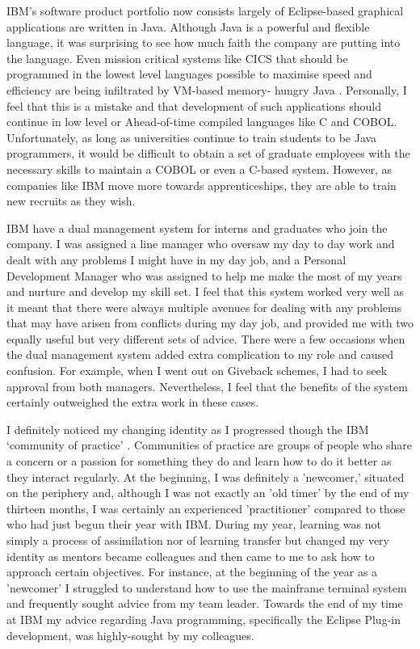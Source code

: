 \documentclass[12pt,a4paper]{article}
\begin{document}
IBM's software product portfolio now consists largely of Eclipse-based 
graphical applications are written in Java. Although Java is a powerful
and flexible language, it was surprising to see how much faith the company
are putting into the language. Even mission critical systems like CICS 
that should be programmed in the lowest level languages possible to 
maximise speed and efficiency are being infiltrated by VM-based memory-
hungry Java \cite{cicsJava}. Personally, I feel that this is a
mistake and that development of such applications should continue in 
low level or Ahead-of-time compiled languages like C and COBOL. Unfortunately,
as long as universities continue to train students to be Java programmers, it
would be difficult to obtain a set of graduate employees with the necessary 
skills to maintain a COBOL or even a C-based system. However, as companies like
IBM move more towards apprenticeships, they are able to train new recruits as
they wish.

IBM have a dual management system for interns and graduates who join the 
company. I was assigned a line manager who oversaw my day to day work and
dealt with any problems I might have in my day job, and a Personal 
Development Manager who was assigned to help me make the most of my years
and nurture and develop my skill set. I feel that this system worked very 
well as it meant that there were always multiple avenues for dealing with
any problems that may have arisen from conflicts during my day job, and 
provided me with two equally useful but very different sets of advice. 
There were a few occasions when the dual management system added extra
complication to my role and caused confusion. For example, when I went
out on Giveback schemes, I had to seek approval from both managers. 
Nevertheless, I feel that the benefits of the system certainly outweighed 
the extra work in these cases.

I definitely noticed my changing identity as I progressed though the IBM
‘community of practice’ \cite{Communities}. Communities of practice are
groups of people who share a concern or a passion for something they do and
learn how to do it better as they interact regularly. At the beginning, I was
definitely a 'newcomer,' situated on the periphery and, although I was not
exactly an 'old timer' by the end of my thirteen months, I was certainly an
experienced 'practitioner' compared to those who had just begun their year with
IBM. During my year, learning was not simply a process of assimilation nor of
learning transfer but changed my very identity as mentors became colleagues and
then came to me to ask how to approach certain objectives. For instance, at the
beginning of the year as a 'newcomer' I struggled to understand how to use the 
mainframe terminal system and 
frequently sought advice from my team leader. Towards
the end of my time at IBM my advice regarding Java programming, specifically the
Eclipse Plug-in development, was highly-sought by my colleagues.
\end{document}
